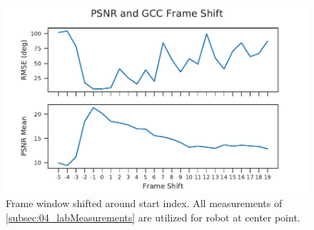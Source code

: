 \begin{figure}[ht]
	\centering
		\includegraphics[]{figures/evaluation/psnr_frame_shift_all_measurements}
	\caption{Frame window shifted around start index. All measurements of
	\cref{subsec:04_labMeasurements} are utilized for robot at center point. }
	\label{fig:ap1_gccFrameShiftAllMeasurements}
\end{figure}
